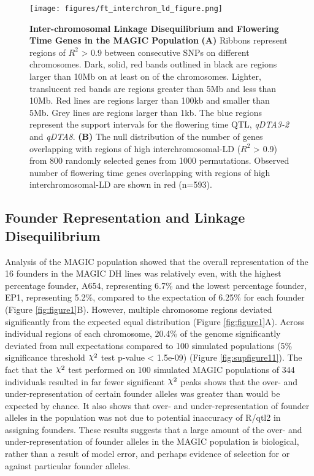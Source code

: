 \documentclass[9pt,twocolumn,twoside]{gsag3jnl}
\DeclareRobustCommand{\rchi}{{\mathpalette\irchi\relax}}
\newcommand{\irchi}[2]{\raisebox{\depth}{$#1\chi$}} %
\begin{document}
\begin{figure}
\texttt{[image: figures/ft\_interchrom\_ld\_figure.png]}
\captionsetup{width=.9\columnwidth}
\caption{\textbf{Inter-chromosomal Linkage Disequilibrium and Flowering Time Genes in the MAGIC Population} \textbf{(A)} Ribbons represent regions of $R^2$ > 0.9 between consecutive SNPs on different chromosomes. Dark, solid, red bands outlined in black are regions larger than 10Mb on at least on of the chromosomes. Lighter, translucent red bands are regions greater than 5Mb and less than 10Mb. Red lines are regions larger than 100kb and smaller than 5Mb. Grey lines are regions larger than 1kb. The blue regions represent the support intervals for the flowering time QTL, \emph{qDTA3-2} and \emph{qDTA8}. \textbf{(B)} The null distribution of the number of genes overlapping with regions of high interchromosomal-LD ($R^2$ > 0.9) from 800 randomly selected genes from 1000 permutations. Observed number of flowering time genes overlapping with regions of high interchromosomal-LD are shown in red (n=593).}
\label{fig:circosfigure}
\end{figure}
\subsection{Founder Representation and Linkage Disequilibrium}

Analysis of the MAGIC population showed that the overall representation of the 16 founders in the MAGIC DH lines was relatively even, with the highest percentage founder, A654, representing 6.7\% and the lowest percentage founder, EP1, representing 5.2\%, compared to the expectation of 6.25\% for each founder (Figure \ref{fig:figure1}B).
However, multiple chromosome regions deviated significantly from the expected equal distribution (Figure \ref{fig:figure1}A).
Across individual regions of each chromosome, 20.4\% of the genome significantly deviated from null expectations compared to 100 simulated populations (5\% significance threshold $\rchi^2$ test p-value < 1.5e-09) (Figure \ref{fig:supfigure11}).
The fact that the $\rchi^2$ test performed on 100 simulated MAGIC populations of 344 individuals resulted in far fewer significant $\rchi^2$ peaks shows that the over- and under-representation of certain founder alleles was greater than would be expected by chance.
It also shows that over- and under-representation of founder alleles in the population was not due to potential inaccuracy of R/qtl2 in assigning founders.
These results suggests that a large amount of the over- and under-representation of founder alleles in the MAGIC population is biological, rather than a result of model error, and perhaps evidence of selection for or against particular founder alleles.
\end{document}
